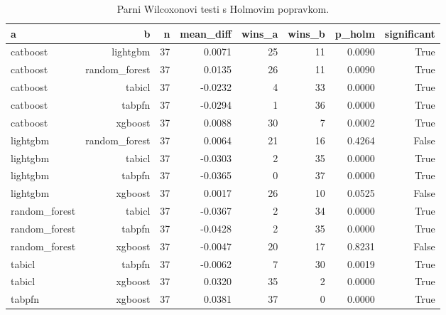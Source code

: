 \begin{table}[htbp]
\centering
\caption{Parni Wilcoxonovi testi s Holmovim popravkom.}
\label{tab:wilcoxon-nonsaturated}
\begin{tabular}{lrrrrrrr}
\hline
a & b & n & mean\_diff & wins\_a & wins\_b & p\_holm & significant \\
\hline
catboost & lightgbm & 37 & 0.0071 & 25 & 11 & 0.0090 & True \\
catboost & random\_forest & 37 & 0.0135 & 26 & 11 & 0.0090 & True \\
catboost & tabicl & 37 & -0.0232 & 4 & 33 & 0.0000 & True \\
catboost & tabpfn & 37 & -0.0294 & 1 & 36 & 0.0000 & True \\
catboost & xgboost & 37 & 0.0088 & 30 & 7 & 0.0002 & True \\
lightgbm & random\_forest & 37 & 0.0064 & 21 & 16 & 0.4264 & False \\
lightgbm & tabicl & 37 & -0.0303 & 2 & 35 & 0.0000 & True \\
lightgbm & tabpfn & 37 & -0.0365 & 0 & 37 & 0.0000 & True \\
lightgbm & xgboost & 37 & 0.0017 & 26 & 10 & 0.0525 & False \\
random\_forest & tabicl & 37 & -0.0367 & 2 & 34 & 0.0000 & True \\
random\_forest & tabpfn & 37 & -0.0428 & 2 & 35 & 0.0000 & True \\
random\_forest & xgboost & 37 & -0.0047 & 20 & 17 & 0.8231 & False \\
tabicl & tabpfn & 37 & -0.0062 & 7 & 30 & 0.0019 & True \\
tabicl & xgboost & 37 & 0.0320 & 35 & 2 & 0.0000 & True \\
tabpfn & xgboost & 37 & 0.0381 & 37 & 0 & 0.0000 & True \\
\hline
\end{tabular}
\end{table}
